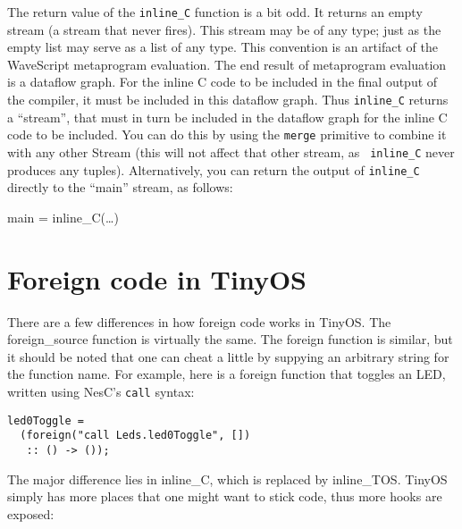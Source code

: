 The return value of the {\tt inline\_C} function is a bit odd.  It
returns an empty stream (a stream that never fires).  This stream may
be of any type; just as the empty list may serve as a list of any
type.  This convention is an artifact of the WaveScript metaprogram
evaluation.  The end result of metaprogram evaluation is a dataflow
graph.  For the inline C code to be included in the final output of
the compiler, it must be included in this dataflow graph.  Thus {\tt inline\_C}
returns a ``stream'', that must in turn be included in the dataflow
graph for the inline C code to be included.
%
You can do this by using the {\tt merge} primitive to combine it with any
other Stream (this will not affect that other stream, as {\tt
inline\_C} never produces any tuples).  Alternatively, you can return the
output of {\tt inline\_C} directly to the ``main'' stream,
as follows:

\begin{wscode}
main = inline\_C(\dots)
\end{wscode}



\section{Foreign code in TinyOS}\label{s:foreigntos}

There are a few differences in how foreign code works in TinyOS. The {\cde
foreign\_source} function is virtually the same.  The {\cde foreign} function is similar,
but it should be noted that one can cheat a little by suppying an
arbitrary string for the function name.  For example, here is a
foreign function that toggles an LED, written using NesC's {\tt call} syntax:

\begin{verbatim}
led0Toggle = 
  (foreign("call Leds.led0Toggle", []) 
   :: () -> ());
\end{verbatim}


The major difference lies in {\cde inline\_C}, which is replaced by
{\cde inline\_TOS}.  TinyOS simply has more places that one might want
to stick code, thus more hooks are exposed:

